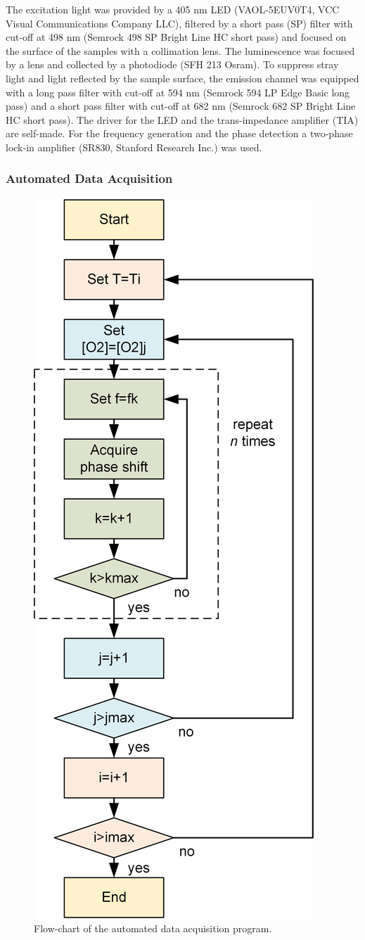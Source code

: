\documentclass[9pt,twocolumn,twoside,pdftex]{optica}
\begin{document}
The excitation light was provided by a 405 nm LED (VAOL-5EUV0T4, VCC Visual Communications Company LLC), filtered by a short pass (SP) filter with cut-off at 498 nm (Semrock 498 SP Bright Line HC short pass) and focused on the surface of the samples with a collimation lens. The luminescence was focused by a lens and collected by a photodiode (SFH 213 Osram).
To suppress stray light and light reflected by the sample surface, the emission channel was equipped with a long pass filter with cut-off at 594 nm (Semrock 594 LP Edge Basic long pass) and a short pass filter with cut-off at 682 nm (Semrock 682 SP Bright Line HC short pass). The driver for the LED and the trans-impedance amplifier (TIA) are self-made.
For the frequency generation and the phase detection a two-phase lock-in amplifier (SR830, Stanford Research Inc.) was used. 

\subsubsection{Automated Data Acquisition}
\label{Data}

\begin{figure}[b!]
\centering
\includegraphics[keepaspectratio, width=5.8 cm]{flow-chart.png}
\caption{Flow-chart of the automated data acquisition program.}
\label{fig:auto-data}
\end{figure}
\end{document}
